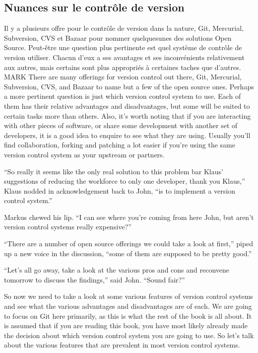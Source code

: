 \subsection{Nuances sur le contrôle de version}
Il y a plusieurs offre pour le contrôle de version dans la nature, Git, Mercurial, Subversion, CVS et Bazaar pour nommer quelquesunes des solutions Open Source.
Peut-être une question plus pertinente est quel système de contrôle de version utiliser.
Chacun d'eux a ses avantages et ses inconvénients relativement aux autres, mais certains sont plus appropriés à certaines taches que d'autres.
MARK
There are many offerings for version control out there, Git, Mercurial, Subversion, CVS, and Bazaar to name but a few of the open source ones.
Perhaps a more pertinent question is just which version control system to use.
Each of them has their relative advantages and disadvantages, but some will be suited to certain tasks more than others.
Also, it's worth noting that if you are interacting with other pieces of software, or share some development with another set of developers, it is a good idea to enquire to see what they are using.
Usually you'll find collaboration, forking and patching a lot easier if you're using the same version control system as your upstream or partners.

\begin{trenches}
``So really it seems like the only real solution to this problem bar Klaus' suggestions of reducing the workforce to only one developer, thank you Klaus,'' Klaus nodded in acknowledgement back to John, ``is to implement a version control system.''

Markus chewed his lip.
``I can see where you're coming from here John, but aren't version control systems really expensive?''

``There are a number of open source offerings we could take a look at first,'' piped up a new voice in the discussion, ``some of them are supposed to be pretty good.''

``Let's all go away, take a look at the various pros and cons and reconvene tomorrow to discuss the findings,'' said John.
``Sound fair?''
\end{trenches}

So now we need to take a look at some various features of version control systems and see what the various advantages and disadvantages are of each.
We are going to focus on Git here primarily, as this is what the rest of the book is all about.
It is assumed that if you are reading this book, you have most likely already made the decision about which version control system you are going to use.
So let's talk about the various features that are prevalent in most version control systems.

